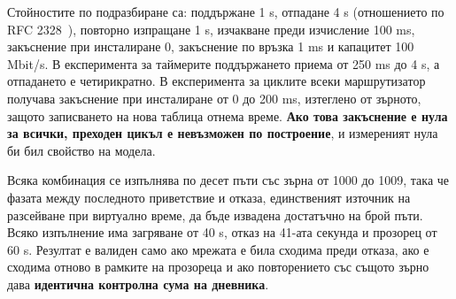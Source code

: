 Стойностите по подразбиране са: поддържане 1 s, отпадане 4 s (отношението по RFC
2328~\cite{rfc2328}), повторно изпращане 1 s, изчакване преди изчисление 100 ms, закъснение
при инсталиране 0, закъснение по връзка 1 ms и капацитет 100 Mbit/s. В експеримента за
таймерите поддържането приема от 250 ms до 4 s, а отпадането е четирикратно. В експеримента за
циклите всеки маршрутизатор получава закъснение при инсталиране от 0 до 200 ms, изтеглено от
зърното, защото записването на нова таблица отнема време. \textbf{Ако това закъснение е нула за
всички, преходен цикъл е невъзможен по построение}, и измереният нула би бил свойство на модела.

Всяка комбинация се изпълнява по десет пъти със зърна от 1000 до 1009, така че фазата между
последното приветствие и отказа, единственият източник на разсейване при виртуално време, да
бъде извадена достатъчно на брой пъти. Всяко изпълнение има загряване от 40 s, отказ на 41-ата
секунда и прозорец от 60 s. Резултат е валиден само ако мрежата е била сходима преди отказа,
ако е сходима отново в рамките на прозореца и ако повторението със същото зърно дава
\textbf{идентична контролна сума на дневника}.
